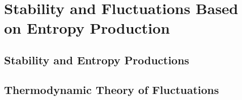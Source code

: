 \chapter{Stability and Fluctuations Based on Entropy Production}
\section{Stability and Entropy Productions}
\section{Thermodynamic Theory of Fluctuations}
